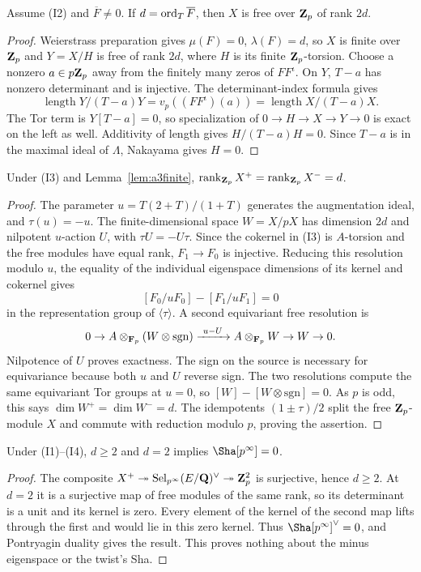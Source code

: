 \begin{lemma}\label{lem:a3finite}
Assume (I2) and $\overline F\ne0$. If $d=\operatorname{ord}_T\overline F$, then $X$ is free over $\mathbf{Z}_p$ of rank $2d$.
\end{lemma}
\begin{proof}
Weierstrass preparation gives $\mu(F)=0$, $\lambda(F)=d$, so $X$ is finite over $\mathbf{Z}_p$ and $Y=X/H$ is free of rank $2d$, where $H$ is its finite $\mathbf{Z}_p$-torsion. Choose a nonzero $a\in p\mathbf{Z}_p$ away from the finitely many zeros of $FF^\iota$. On $Y$, $T-a$ has nonzero determinant and is injective. The determinant-index formula gives
\[
\operatorname{length}Y/(T-a)Y=v_p((FF^\iota)(a))
=\operatorname{length}X/(T-a)X.
\]
The Tor term is $Y[T-a]=0$, so specialization of $0\to H\to X\to Y\to0$ is exact on the left as well. Additivity of length gives $H/(T-a)H=0$. Since $T-a$ is in the maximal ideal of $\Lambda$, Nakayama gives $H=0$.
\end{proof}

\begin{lemma}\label{lem:a3balance}
Under (I3) and Lemma~\ref{lem:a3finite}, $\operatorname{rank}_{\mathbf{Z}_p}X^+=\operatorname{rank}_{\mathbf{Z}_p}X^-=d$.
\end{lemma}
\begin{proof}
The parameter $u=T(2+T)/(1+T)$ generates the augmentation ideal, and $\tau(u)=-u$. The finite-dimensional space $W=X/pX$ has dimension $2d$ and nilpotent $u$-action $U$, with $\tau U=-U\tau$.
Since the cokernel in (I3) is $A$-torsion and the free modules have equal rank, $F_1\to F_0$ is injective. Reducing this resolution modulo $u$, the equality of the individual eigenspace dimensions of its kernel and cokernel gives
\[
[F_0/uF_0]-[F_1/uF_1]=0
\]
in the representation group of $\langle\tau\rangle$. A second equivariant free resolution is
\[
0\to A\otimes_{\mathbf{F}_p}(W\otimes\mathrm{sgn})
\xrightarrow{\ u-U\ } A\otimes_{\mathbf{F}_p}W\to W\to0.
\]
Nilpotence of $U$ proves exactness. The sign on the source is necessary for equivariance because both $u$ and $U$ reverse sign. The two resolutions compute the same equivariant Tor groups at $u=0$, so $[W]-[W\otimes\mathrm{sgn}]=0$. As $p$ is odd, this says $\dim W^+=\dim W^-=d$. The idempotents $(1\pm\tau)/2$ split the free $\mathbf{Z}_p$-module $X$ and commute with reduction modulo $p$, proving the assertion.
\end{proof}

\begin{lemma}\label{lem:a3quotient}
Under (I1)--(I4), $d\ge2$ and $d=2$ implies $\Sha[p^\infty]=0$.
\end{lemma}
\begin{proof}
The composite $X^+\twoheadrightarrow\operatorname{Sel}_{p^\infty}(E/\mathbf{Q})^\vee\twoheadrightarrow\mathbf{Z}_p^2$ is surjective, hence $d\ge2$. At $d=2$ it is a surjective map of free modules of the same rank, so its determinant is a unit and its kernel is zero. Every element of the kernel of the second map lifts through the first and would lie in this zero kernel. Thus $\Sha[p^\infty]^\vee=0$, and Pontryagin duality gives the result. This proves nothing about the minus eigenspace or the twist's Sha.
\end{proof}

